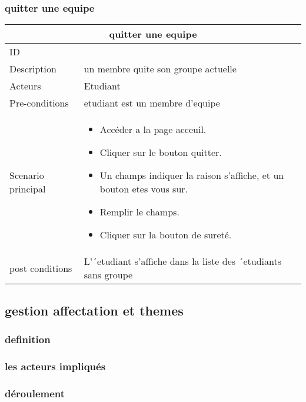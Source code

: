 \documentclass[11pt,fleqn]{book} %
\begin{document}
\subsubsection{quitter une equipe}
\begin{center}
\begin{tabularx}{1\textwidth} { | p{4cm} | >{\raggedright\arraybackslash}X |  }
  \hline
  \multicolumn{2}{|c|}{quitter une equipe} \\
 \hline
 ID & 5  \\
 \hline
 Description  & un membre quite son groupe actuelle \\
  \hline
 Acteurs  & Etudiant   \\
  \hline
 Pre-conditions  & etudiant est un membre d'equipe\\
 \hline
 Scenario principal  &  
 \begin{itemize}
     \item  Accéder a la page acceuil.
     \item Cliquer sur le bouton quitter.
     \item Un champs indiquer la raison s’affiche, et un bouton etes vous sur.
     \item Remplir le champs.
     \item Cliquer sur la bouton de sureté.
 \end{itemize}\\
  \hline
 post conditions  &   L’´etudiant s’affiche dans la liste des ´etudiants sans groupe  \\
  \hline
\end{tabularx}
\label{tbl:nicetablelesstable}
\end{center}


\subsection{gestion affectation et themes }
\subsubsection{definition}
\subsubsection{les acteurs impliqués}
\subsubsection{déroulement}
\end{document}
